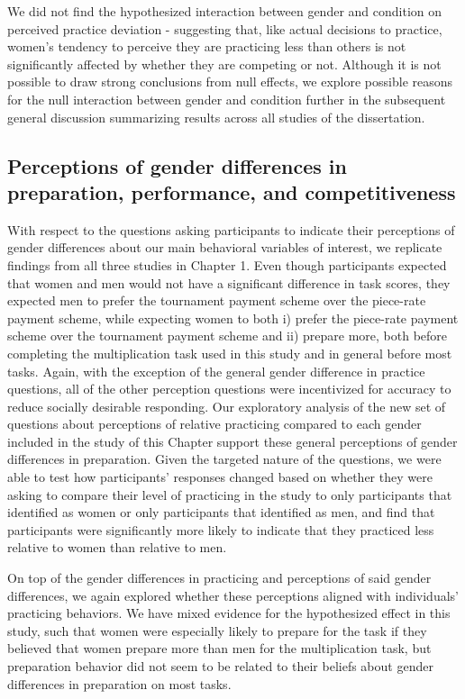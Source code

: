 \documentclass[letterpaper, nobind]{templates/ociamthesis}
\begin{document}
We did not find the hypothesized interaction between gender and condition on perceived practice deviation - suggesting that, like actual decisions to practice, women's tendency to perceive they are practicing less than others is not significantly affected by whether they are competing or not. Although it is not possible to draw strong conclusions from null effects, we explore possible reasons for the null interaction between gender and condition further in the subsequent general discussion summarizing results across all studies of the dissertation.

\hypertarget{perceptions-of-gender-differences-in-preparation-performance-and-competitiveness-6}{%
\subsection{Perceptions of gender differences in preparation, performance, and competitiveness}\label{perceptions-of-gender-differences-in-preparation-performance-and-competitiveness-6}}

With respect to the questions asking participants to indicate their perceptions of gender differences about our main behavioral variables of interest, we replicate findings from all three studies in Chapter 1. Even though participants expected that women and men would not have a significant difference in task scores, they expected men to prefer the tournament payment scheme over the piece-rate payment scheme, while expecting women to both i) prefer the piece-rate payment scheme over the tournament payment scheme and ii) prepare more, both before completing the multiplication task used in this study and in general before most tasks. Again, with the exception of the general gender difference in practice questions, all of the other perception questions were incentivized for accuracy to reduce socially desirable responding. Our exploratory analysis of the new set of questions about perceptions of relative practicing compared to each gender included in the study of this Chapter support these general perceptions of gender differences in preparation. Given the targeted nature of the questions, we were able to test how participants' responses changed based on whether they were asking to compare their level of practicing in the study to only participants that identified as women or only participants that identified as men, and find that participants were significantly more likely to indicate that they practiced less relative to women than relative to men.

On top of the gender differences in practicing and perceptions of said gender differences, we again explored whether these perceptions aligned with individuals' practicing behaviors. We have mixed evidence for the hypothesized effect in this study, such that women were especially likely to prepare for the task if they believed that women prepare more than men for the multiplication task, but preparation behavior did not seem to be related to their beliefs about gender differences in preparation on most tasks.
\end{document}
